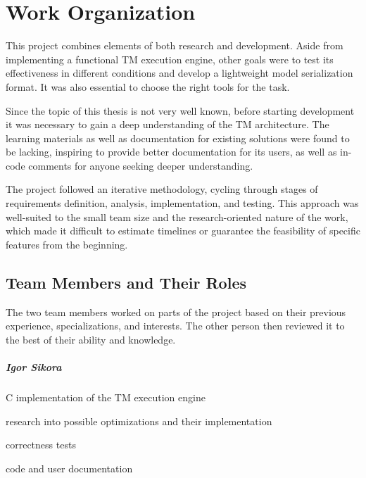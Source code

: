 \chapter{Work Organization}
\label{chap:work-organization}

This project combines elements of both research and development. Aside from implementing a functional TM execution engine, other goals were to test its effectiveness in different conditions and develop a lightweight model serialization format. It was also essential to choose the right tools for the task.

Since the topic of this thesis is not very well known, before starting development it was necessary to gain a deep understanding of the TM architecture. The learning materials as well as documentation for existing solutions were found to be lacking, inspiring \LibraryName to provide better documentation for its users, as well as in-code comments for anyone seeking deeper understanding.

The project followed an iterative methodology, cycling through stages of requirements definition, analysis, implementation, and testing. This approach was well-suited to the small team size and the research-oriented nature of the work, which made it difficult to estimate timelines or guarantee the feasibility of specific features from the beginning.

\section{Team Members and Their Roles}

The two team members worked on parts of the project based on their previous experience, specializations, and interests. The other person then reviewed it to the best of their ability and knowledge.

\paragraph{Igor Sikora}
\begin{compactitem}
    \item C implementation of the TM execution engine
    \item research into possible optimizations and their implementation
    \item correctness tests
    \item code and user documentation
\end{compactitem}

